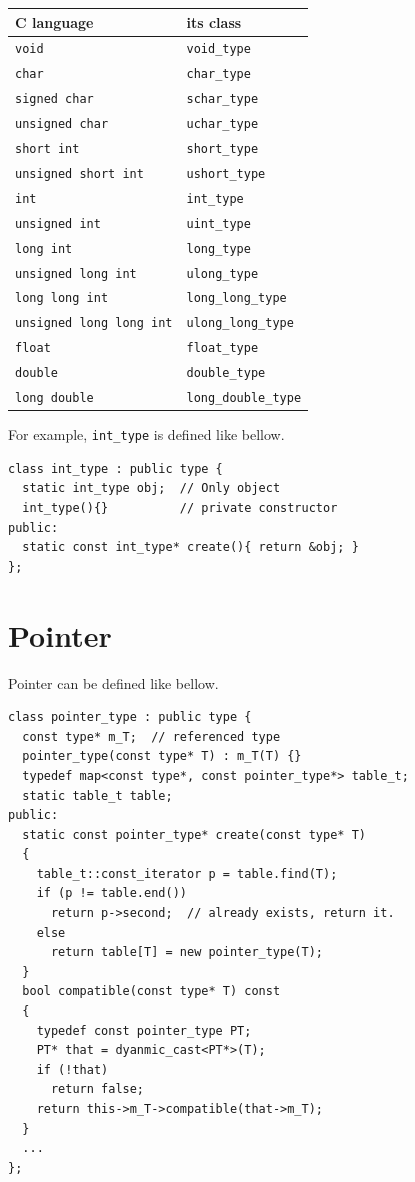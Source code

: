 \begin{tabular}{|l|l|} \hline
C language & its class \\ \hline
{\tt{void}} & {\tt{void\_type}} \\ \hline
{\tt{char}} & {\tt{char\_type}} \\  \hline
{\tt{signed char}} & {\tt{schar\_type}} \\  \hline
{\tt{unsigned char}} & {\tt{uchar\_type}} \\  \hline
{\tt{short int}} & {\tt{short\_type}} \\  \hline
{\tt{unsigned short int}} & {\tt{ushort\_type}} \\  \hline
{\tt{int}} & {\tt{int\_type}} \\ \hline
{\tt{unsigned int}} & {\tt{uint\_type}} \\  \hline
{\tt{long int}} & {\tt{long\_type}} \\ \hline
{\tt{unsigned long int}} & {\tt{ulong\_type}} \\ \hline
{\tt{long long int}} & {\tt{long\_long\_type}} \\ \hline
{\tt{unsigned long long int}} & {\tt{ulong\_long\_type}} \\ \hline
{\tt{float}} & {\tt{float\_type}} \\ \hline
{\tt{double}} & {\tt{double\_type}} \\ \hline
{\tt{long double}} & {\tt{long\_double\_type}} \\ \hline
\end{tabular}

\vspace{0.5cm}

For example, {\tt{int\_type}} is defined like bellow.
\begin{verbatim}
class int_type : public type {
  static int_type obj;  // Only object
  int_type(){}          // private constructor
public:
  static const int_type* create(){ return &obj; }
};
\end{verbatim}

\section{Pointer}
\label{type_e003}
Pointer can be defined like bellow.
\begin{verbatim}
class pointer_type : public type {
  const type* m_T;  // referenced type
  pointer_type(const type* T) : m_T(T) {}
  typedef map<const type*, const pointer_type*> table_t;
  static table_t table;
public:
  static const pointer_type* create(const type* T)
  {
    table_t::const_iterator p = table.find(T);
    if (p != table.end())
      return p->second;  // already exists, return it.
    else
      return table[T] = new pointer_type(T);
  }
  bool compatible(const type* T) const
  {
    typedef const pointer_type PT;
    PT* that = dyanmic_cast<PT*>(T);
    if (!that)
      return false;
    return this->m_T->compatible(that->m_T);
  }
  ...
};
\end{verbatim}

